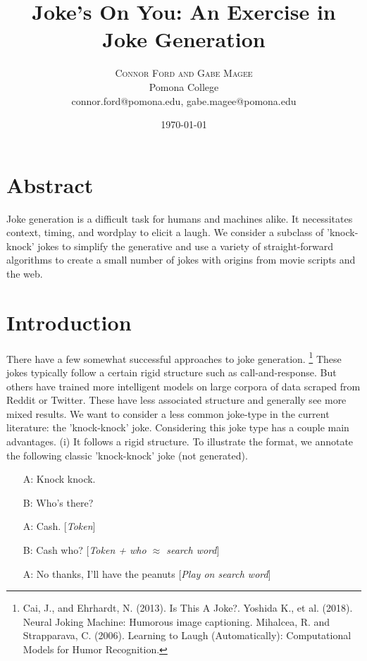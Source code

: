\documentclass[twoside,twocolumn]{article}
\title{Joke's On You: An Exercise in Joke Generation}
\author{%
\textsc{Connor Ford and Gabe Magee} \\[1ex] 
\normalsize Pomona College \\ 
\normalsize connor.ford@pomona.edu, gabe.magee@pomona.edu
}
\date{\today}
\begin{document}
\maketitle

\section*{Abstract}

Joke generation is a difficult task for humans and machines alike. It necessitates context, timing, and wordplay to elicit a laugh. We consider a subclass of 'knock-knock' jokes to simplify the generative and use a variety of straight-forward algorithms to create a small number of jokes with origins from movie scripts and the web.

\section{Introduction}

There have a few somewhat successful approaches to joke generation. \footnote{Cai, J., and Ehrhardt, N. (2013). Is This A Joke?. Yoshida K., et al. (2018). Neural Joking Machine: Humorous image captioning. Mihalcea, R. and Strapparava, C. (2006). Learning to Laugh (Automatically): Computational Models for Humor Recognition.} 
These jokes typically follow a certain rigid structure such as call-and-response. But others have trained more intelligent models on large corpora of data scraped from Reddit or Twitter. These have less associated structure and generally see more mixed results.
We want to consider a less common joke-type in the current literature: the 'knock-knock' joke. Considering this joke type has a couple main advantages.
(i) It follows a rigid structure. To illustrate the format, we annotate the following classic 'knock-knock' joke (not generated).
\begin{center}
\begin{enumerate}
\item[A:] Knock knock.
\item[B:] Who's there?
\item[A:] Cash. [\emph{Token}]
\item[B:] Cash who? [\emph{Token + who $\approx$ search word}]
\item[A:] No thanks, I'll have the peanuts [\emph{Play on search word}]
\end{enumerate}
\end{center}
\end{document}
